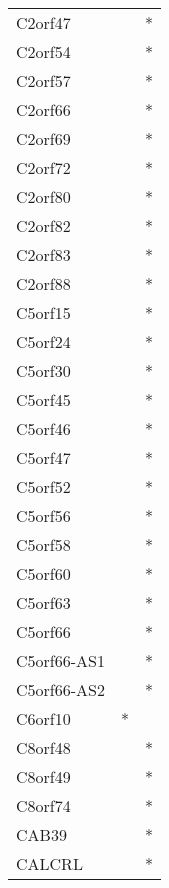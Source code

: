 \begin{longtable}{lcc}
C2orf47         &                &          * \\
C2orf54         &                &          * \\
C2orf57         &                &          * \\
C2orf66         &                &          * \\
C2orf69         &                &          * \\
C2orf72         &                &          * \\
C2orf80         &                &          * \\
C2orf82         &                &          * \\
C2orf83         &                &          * \\
C2orf88         &                &          * \\
C5orf15         &                &          * \\
C5orf24         &                &          * \\
C5orf30         &                &          * \\
C5orf45         &                &          * \\
C5orf46         &                &          * \\
C5orf47         &                &          * \\
C5orf52         &                &          * \\
C5orf56         &                &          * \\
C5orf58         &                &          * \\
C5orf60         &                &          * \\
C5orf63         &                &          * \\
C5orf66         &                &          * \\
C5orf66-AS1     &                &          * \\
C5orf66-AS2     &                &          * \\
C6orf10         &              * &            \\
C8orf48         &                &          * \\
C8orf49         &                &          * \\
C8orf74         &                &          * \\
CAB39           &                &          * \\
CALCRL          &                &          * \\

\end{longtable}
